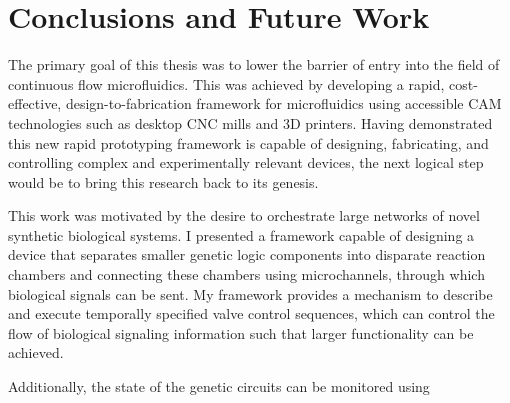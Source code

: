 \chapter{Conclusions and Future Work}
\label{chapter:Conclusions}
\thispagestyle{myheadings}

\graphicspath{{3_Conclusion/Figures/}}

The primary goal of this thesis was to lower the barrier of entry into the field of continuous flow microfluidics. This was achieved by developing a rapid, cost-effective, design-to-fabrication framework for microfluidics using accessible CAM technologies such as desktop CNC mills and 3D printers. Having demonstrated this new rapid prototyping framework is capable of designing, fabricating, and controlling complex and experimentally relevant devices, the next logical step would be to bring this research back to its genesis. 

This work was motivated by the desire to orchestrate large networks of novel synthetic biological systems. I presented a framework capable of designing a device that separates smaller genetic logic components into disparate reaction chambers and connecting these chambers using microchannels, through which biological signals can be sent. My framework provides a mechanism to describe and execute temporally specified valve control sequences, which can control the flow of biological signaling information such that larger functionality can be achieved. 

Additionally, the state of the genetic circuits can be monitored using 
